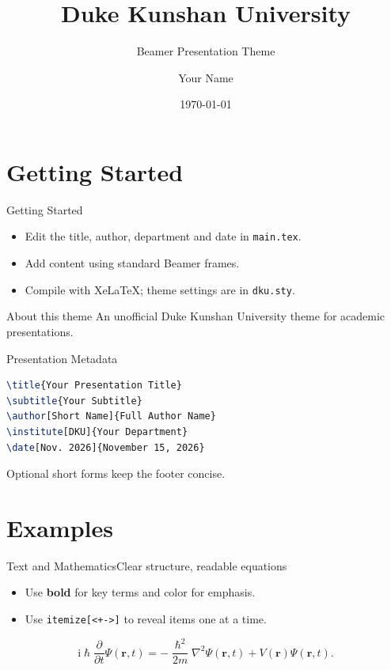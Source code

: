 \documentclass[10pt,aspectratio=169]{beamer}
\title{Duke Kunshan University}
\subtitle{Beamer Presentation Theme}
\author[Your Name]{Your Name}
\institute[DKU]{Your Department}
\date{\today}
\begin{document}
\maketitle

\section{Getting Started}

\begin{frame}{Getting Started}
  \begin{itemize}
    \item Edit the title, author, department and date in \texttt{main.tex}.
    \item Add content using standard Beamer frames.
    \item Compile with XeLaTeX; theme settings are in \texttt{dku.sty}.
  \end{itemize}
  \begin{block}{About this theme}
    An unofficial Duke Kunshan University theme for academic presentations.
  \end{block}
\end{frame}

\begin{frame}[fragile]{Presentation Metadata}
\begin{lstlisting}[language=TeX]
\title{Your Presentation Title}
\subtitle{Your Subtitle}
\author[Short Name]{Full Author Name}
\institute[DKU]{Your Department}
\date[Nov. 2026]{November 15, 2026}
\end{lstlisting}
  Optional short forms keep the footer concise.
\end{frame}

\section{Examples}

\begin{frame}{Text and Mathematics}{Clear structure, readable equations}
  \begin{itemize}
    \item Use \textbf{bold} for key terms and \alert{color} for emphasis.
    \item Use \texttt{itemize[<+->]} to reveal items one at a time.
  \end{itemize}
  \begin{equation*}
    \mathrm{i}\hslash\frac{\partial}{\partial t}\Psi(\mathbf{r},t)
    = -\frac{\hslash^2}{2m}\nabla^2\Psi(\mathbf{r},t)
      + V(\mathbf{r})\Psi(\mathbf{r},t).
  \end{equation*}
\end{frame}
\end{document}
